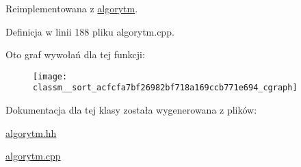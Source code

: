 \-Reimplementowana z \hyperlink{classalgorytm_af3f92bf537b1f2e1f93173983e838449}{algorytm}.



\-Definicja w linii 188 pliku algorytm.\-cpp.



\-Oto graf wywołań dla tej funkcji\-:
\nopagebreak
\begin{figure}[H]
\begin{center}
\leavevmode
\texttt{[image: classm\_\_sort\_acfcfa7bf26982bf718a169ccb771e694\_cgraph]}
\end{center}
\end{figure}




\-Dokumentacja dla tej klasy została wygenerowana z plików\-:\begin{DoxyCompactItemize}
\item 
\hyperlink{algorytm_8hh}{algorytm.\-hh}\item 
\hyperlink{algorytm_8cpp}{algorytm.\-cpp}\end{DoxyCompactItemize}
